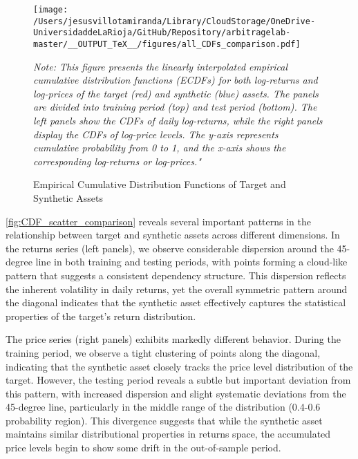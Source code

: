 \begin{figure}[H]
  \caption{Empirical Cumulative Distribution Functions of Target and Synthetic Assets}
  \centering
  \texttt{[image: /Users/jesusvillotamiranda/Library/CloudStorage/OneDrive-UniversidaddeLaRioja/GitHub/Repository/arbitragelab-master/\_\_OUTPUT\_TeX\_\_/figures/all\_CDFs\_comparison.pdf]}
  \label{fig:all_CDFs_comparison}
\vspace{0.5cm}
\begin{minipage}{\textwidth}
\setlength{\parindent}{0pt}
\small\textit{Note: 
This figure presents the linearly interpolated empirical cumulative distribution functions (ECDFs) for both log-returns and log-prices of the target (red) and synthetic (blue) assets. The panels are divided into training period (top) and test period (bottom). The left panels show the CDFs of daily log-returns, while the right panels display the CDFs of log-price levels. The y-axis represents cumulative probability from 0 to 1, and the x-axis shows the corresponding log-returns or log-prices."
}
\end{minipage}
\end{figure}

\cref{fig:CDF_scatter_comparison} reveals several important patterns in the relationship between target and synthetic assets across different dimensions. In the returns series (left panels), we observe considerable dispersion around the 45-degree line in both training and testing periods, with points forming a cloud-like pattern that suggests a consistent dependency structure. This dispersion reflects the inherent volatility in daily returns, yet the overall symmetric pattern around the diagonal indicates that the synthetic asset effectively captures the statistical properties of the target's return distribution.

The price series (right panels) exhibits markedly different behavior. During the training period, we observe a tight clustering of points along the diagonal, indicating that the synthetic asset closely tracks the price level distribution of the target. However, the testing period reveals a subtle but important deviation from this pattern, with increased dispersion and slight systematic deviations from the 45-degree line, particularly in the middle range of the distribution (0.4-0.6 probability region). This divergence suggests that while the synthetic asset maintains similar distributional properties in returns space, the accumulated price levels begin to show some drift in the out-of-sample period.

